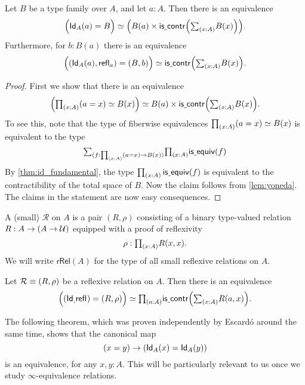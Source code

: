 \begin{cor}
Let $B$ be a type family over $A$, and let $a:A$. Then there is an equivalence
\begin{equation*}
\eqv{\Big(\idtypevar{A}(a)=B\Big)}{\Big(B(a)\times\iscontr\Big(\sm{x:A}B(x)\Big)\Big)}.
\end{equation*}
Furthermore, for $b:B(a)$ there is an equivalence
\begin{equation*}
\eqv{\Big((\idtypevar{A}(a),\refl{a})=(B,b)\Big)}{\iscontr\Big(\sm{x:A}B(x)\Big)}.
\end{equation*}
\end{cor}

\begin{proof}
First we show that there is an equivalence
\begin{equation*}
\eqv{\Big(\prd{x:A} (a=x)\eqvsym B(x)\Big)}{B(a)\times\iscontr\Big(\sm{x:A}B(x)\Big)}.
\end{equation*}
To see this, note that the type of fiberwise equivalences $\prd{x:A} (a=x)\eqvsym B(x)$ is equivalent to the type
\begin{equation*}
\sm{f:\prd{x:A}(a=x)\to B(x)}\prd{x:A}\isequiv(f)
\end{equation*}
By \cref{thm:id_fundamental}, the type $\prd{x:A}\isequiv(f)$ is equivalent to the contractibility of the total space of $B$. Now the claim follows from \cref{lem:yoneda}. The claims in the statement are now easy consequences.
\end{proof}

\begin{defn}\label{defn:rrel}
A (small)  $\mathcal{R}$ on $A$ is a pair $(R,\rho)$ consisting of a binary type-valued relation $R:A\to (A\to \mathcal{U})$ equipped with a proof of reflexivity
\begin{equation*}
\rho : \prd{x:A}R(x,x).
\end{equation*}
We will write $\mathsf{rRel}(A)$ for the type of all small reflexive relations on $A$.
\end{defn}

\begin{cor}\label{cor:yoneda_rel}
Let $\mathcal{R}\equiv (R,\rho)$ be a reflexive relation on $A$.
Then there is an equivalence
\begin{equation*}
\eqv{\Big((\idtypevar,\refl{})=(R,\rho)\Big)}{\prd{a:A}\iscontr\Big(\sm{x:A}R(a,x)\Big)}.
\end{equation*}
\end{cor}

The following theorem, which was proven independently by Escardó \cite{Escardo2016} around the same time, shows that the canonical map
\begin{equation*}
(x=y)\to (\mathsf{Id}_{A}(x)=\mathsf{Id}_{A}(y))
\end{equation*}
is an equivalence, for any $x,y:A$. This will be particularly relevant to us once we study $\infty$-equivalence relations.


